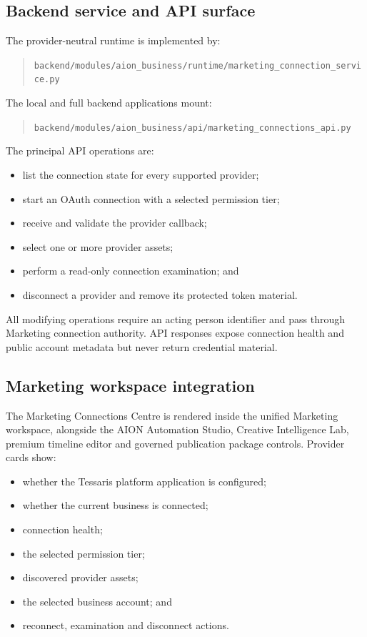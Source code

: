 \subsection{Backend service and API surface}

The provider-neutral runtime is implemented by:

\begin{quote}
\texttt{backend/modules/aion\_business/runtime/marketing\_connection\_service.py}
\end{quote}

The local and full backend applications mount:

\begin{quote}
\texttt{backend/modules/aion\_business/api/marketing\_connections\_api.py}
\end{quote}

The principal API operations are:

\begin{itemize}
    \item list the connection state for every supported provider;
    \item start an OAuth connection with a selected permission tier;
    \item receive and validate the provider callback;
    \item select one or more provider assets;
    \item perform a read-only connection examination; and
    \item disconnect a provider and remove its protected token material.
\end{itemize}

All modifying operations require an acting person identifier and pass through Marketing connection authority. API responses expose connection health and public account metadata but never return credential material.

\subsection{Marketing workspace integration}

The Marketing Connections Centre is rendered inside the unified Marketing workspace, alongside the AION Automation Studio, Creative Intelligence Lab, premium timeline editor and governed publication package controls. Provider cards show:

\begin{itemize}
    \item whether the Tessaris platform application is configured;
    \item whether the current business is connected;
    \item connection health;
    \item the selected permission tier;
    \item discovered provider assets;
    \item the selected business account; and
    \item reconnect, examination and disconnect actions.
\end{itemize}

